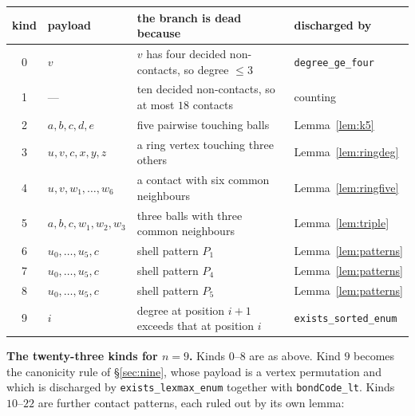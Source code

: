 \documentclass[11pt,a4paper]{article}
\theoremstyle{plain}
\theoremstyle{definition}
\begin{document}
\begin{center}
\small
\begin{tabular}{cl p{5.1cm} l}
\toprule
kind & payload & the branch is dead because & discharged by \\
\midrule
0 & $v$                       & $v$ has four decided non-contacts, so degree $\le 3$
                              & \texttt{degree\_ge\_four} \\
1 & ---                       & ten decided non-contacts, so at most $18$ contacts
                              & counting \\
2 & $a,b,c,d,e$               & five pairwise touching balls
                              & Lemma~\ref{lem:k5} \\
3 & $u,v,c,x,y,z$             & a ring vertex touching three others
                              & Lemma~\ref{lem:ringdeg} \\
4 & $u,v,w_1,\dots,w_6$       & a contact with six common neighbours
                              & Lemma~\ref{lem:ringfive} \\
5 & $a,b,c,w_1,w_2,w_3$       & three balls with three common neighbours
                              & Lemma~\ref{lem:triple} \\
6 & $u_0,\dots,u_5,c$         & shell pattern $P_1$
                              & Lemma~\ref{lem:patterns} \\
7 & $u_0,\dots,u_5,c$         & shell pattern $P_4$
                              & Lemma~\ref{lem:patterns} \\
8 & $u_0,\dots,u_5,c$         & shell pattern $P_5$
                              & Lemma~\ref{lem:patterns} \\
9 & $i$                       & degree at position $i+1$ exceeds that at position $i$
                              & \texttt{exists\_sorted\_enum} \\
\bottomrule
\end{tabular}
\end{center}

\medskip
\noindent\textbf{The twenty-three kinds for $n = 9$.} Kinds $0$--$8$ are as above. Kind
$9$ becomes the canonicity rule of \S\ref{sec:nine}, whose payload is a vertex
permutation and which is discharged by \texttt{exists\_lexmax\_enum} together with
\texttt{bondCode\_lt}. Kinds $10$--$22$ are further contact patterns, each ruled out by
its own lemma:
\end{document}
